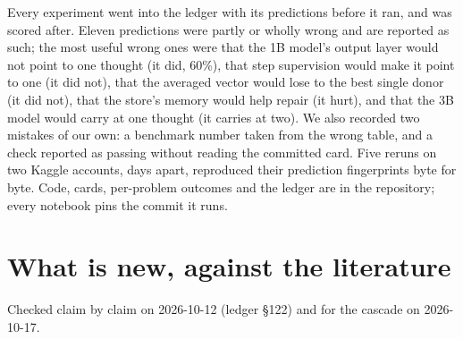 \documentclass{article}
\begin{document}
Every experiment went into the ledger with its predictions before it ran, and was scored after. Eleven predictions were partly or wholly wrong and are reported as such; the most useful wrong ones were that the 1B model's output layer would not point to one thought (it did, 60\%), that step supervision would make it point to one (it did not), that the averaged vector would lose to the best single donor (it did not), that the store's memory would help repair (it hurt), and that the 3B model would carry at one thought (it carries at two). We also recorded two mistakes of our own: a benchmark number taken from the wrong table, and a check reported as passing without reading the committed card. Five reruns on two Kaggle accounts, days apart, reproduced their prediction fingerprints byte for byte. Code, cards, per-problem outcomes and the ledger are in the repository; every notebook pins the commit it runs.

\section{What is new, against the literature}

Checked claim by claim on 2026-10-12 (ledger \S122) and for the cascade on 2026-10-17.
\end{document}
